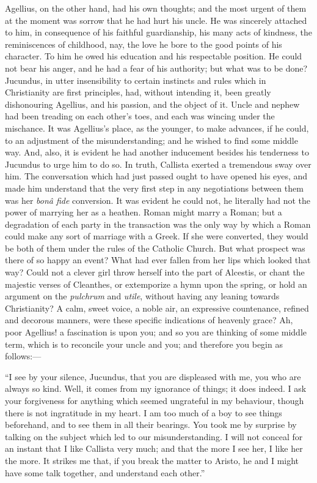 Agellius, on the other hand, had his own thoughts; and the most
urgent of them at the moment was sorrow that he had hurt his uncle. He
was sincerely attached to him, in consequence of his faithful
guardianship, his many acts of kindness, the reminiscences of
childhood, nay, the love he bore to the good points of his character.
To him he owed his education and his respectable position. He could
not bear his anger, and he had a fear of his authority; but what was
to be done? Jucundus, in utter insensibility to certain instincts and
rules which in Christianity are first principles, had, without
intending it, been greatly dishonouring Agellius, and his passion, and
the object of it. Uncle and nephew had been treading on each other's
toes, and each was wincing under the mischance. It was Agellius's
place, as the younger, to make advances, if he could, to an adjustment
of the misunderstanding; and he wished to find some middle way. And,
also, it is evident he had another inducement besides his tenderness
to Jucundus to urge him to do so. In truth, Callista exerted a
tremendous sway over him. The conversation which had just passed ought
to have opened his eyes, and made him understand that the very first
step in any negotiations between them was her \emph{bonâ fide}
conversion. It was evident he could not, he literally had not the
power of marrying her as a heathen. Roman might marry a Roman; but a
degradation of each party in the transaction was the only way by which
a Roman could make any sort of marriage with a Greek. If she were
converted, they would be both of them under the rules of the Catholic
Church. But what prospect was there of so happy an event? What had
ever fallen from her lips which looked that way? Could not a
clever girl throw herself into the part of Alcestis, or chant the
majestic verses of Cleanthes, or extemporize a hymn upon the spring,
or hold an argument on the \emph{pulchrum} and \emph{utile}, without
having any leaning towards Christianity? A calm, sweet voice, a noble
air, an expressive countenance, refined and decorous manners, were
these specific indications of heavenly grace? Ah, poor Agellius! a
fascination is upon you; and so you are thinking of some middle term,
which is to reconcile your uncle and you; and therefore you begin as
follows:—

``I see by your silence, Jucundus, that you are displeased with
me, you who are always so kind. Well, it comes from my ignorance of
things; it does indeed. I ask your forgiveness for anything which
seemed ungrateful in my behaviour, though there is not ingratitude in
my heart. I am too much of a boy to see things beforehand, and to see
them in all their bearings. You took me by surprise by talking on the
subject which led to our misunderstanding. I will not conceal for an
instant that I like Callista very much; and that the more I see her, I
like her the more. It strikes me that, if you break the matter to
Aristo, he and I might have some talk together, and understand each
other.''

